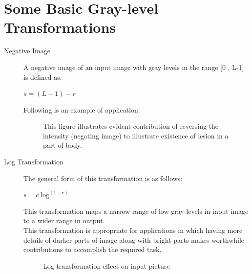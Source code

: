 \documentclass{article}
\begin{document}
\section{Some Basic Gray-level Transformations}
 \begin{description}
 \item [Negative Image] A negative image of an input image with gray levels in the range [0 , L-1] is defined as:\\
 \begin{center}
 $s = (L-1) - r$
 \end{center}
 Following is an example of application:
 \begin{figure}
 \center
{}
\caption{This figure illustrates evident contribution of reversing the intensity (negating image) to illustrate existence of lesion in a part of body.}
 \end{figure}
 
 \item [Log Transformation] The general form of this transformation is as follows:\\
 \begin{center}
 $s = c \log^{(1+r)}$
 \end{center}
 This transformation maps a narrow range of low gray-levels in input image to a wider range in output.\\
 This transformation is appropriate for applications in which having more details of darker parts of image along with bright parts makes worthwhile contributions to accomplish the required task.
 \begin{figure}
 \center
 \caption{Log transformation effect on input picture}
 \end{figure}
 

\end{description}
\end{document}
